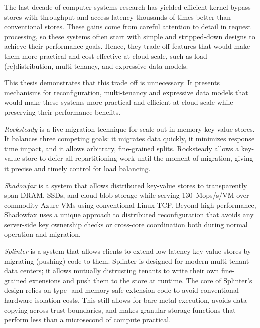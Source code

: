 The last decade of computer systems research has yielded efficient
kernel-bypass stores with throughput and access latency thousands
of times better than conventional stores.
%
These gains come from careful attention to detail in request processing,
so these systems often start with simple and stripped-down designs to
achieve their performance goals.
%
Hence, they trade off
features that
would make them more practical and cost effective at cloud scale,
such as load (re)distribution, multi-tenancy, and
expressive data models.

This thesis demonstrates that this trade off is unnecessary.
It presents mechanisms for
reconfiguration, multi-tenancy and expressive data
models that
would make these systems more practical and
efficient at cloud scale while preserving their performance
benefits.

\emph{Rocksteady}
is a live migration technique for scale-out
in-memory key-value stores.
%
It balances three competing goals: it
migrates data quickly, it minimizes response time impact, and it
allows arbitrary, fine-grained splits.
%
Rocksteady allows a key-value store to defer all repartitioning work
until the moment of migration, giving it precise and timely control for
load balancing.

\emph{Shadowfax} is
a system that
allows distributed key-value stores to
transparently span DRAM, SSDs, and cloud blob storage while serving
130~Mops/s/VM over commodity Azure VMs using conventional Linux TCP.
%
Beyond
high performance, Shadowfax uses a unique approach to distributed
reconfiguration that avoids any server-side key ownership checks
or cross-core coordination both during normal operation and migration.

\emph{Splinter} is a system that
allows clients
to extend low-latency key-value stores by migrating (pushing) code to them.
%
Splinter is designed for
modern multi-tenant data centers; it allows mutually distrusting tenants to write
their own fine-grained extensions and push
them to the store at runtime.
%
The core of
Splinter's design relies on type- and memory-safe
extension code to avoid conventional hardware isolation costs.
%
This
still allows for bare-metal execution, avoids data copying across trust
boundaries, and makes granular storage functions that perform less than
a microsecond of compute practical.
